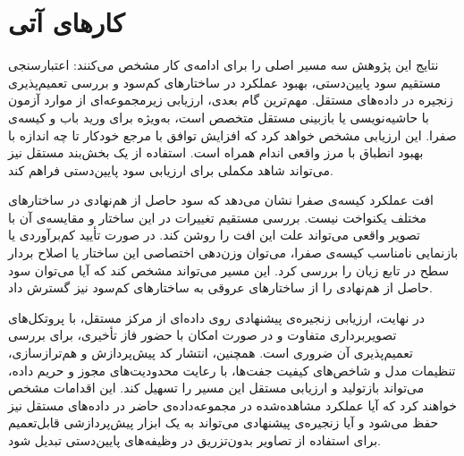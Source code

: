 \section{کارهای آتی}

\label{sec:c-future}

نتایج این پژوهش سه مسیر اصلی را برای ادامه‌ی کار مشخص می‌کنند: اعتبارسنجی مستقیم سود پایین‌دستی، بهبود عملکرد در ساختارهای کم‌سود و بررسی تعمیم‌پذیری زنجیره در داده‌های مستقل. مهم‌ترین گام بعدی، ارزیابی زیرمجموعه‌ای از موارد آزمون با حاشیه‌نویسی یا بازبینی مستقل متخصص است، به‌ویژه برای ورید باب و کیسه‌ی صفرا. این ارزیابی مشخص خواهد کرد که افزایش توافق با مرجع خودکار تا چه اندازه با بهبود انطباق با مرز واقعی اندام همراه است. استفاده از یک بخش‌بند مستقل نیز می‌تواند شاهد مکملی برای ارزیابی سود پایین‌دستی فراهم کند.

افت عملکرد کیسه‌ی صفرا نشان می‌دهد که سود حاصل از هم‌نهادی در ساختارهای مختلف یکنواخت نیست. بررسی مستقیم تغییرات  در این ساختار و مقایسه‌ی آن با تصویر واقعی می‌تواند علت این افت را روشن کند. در صورت تأیید کم‌برآوردی یا بازنمایی نامناسب کیسه‌ی صفرا، می‌توان وزن‌دهی اختصاصی این ساختار یا اصلاح بردار سطح در تابع زیان را بررسی کرد. این مسیر می‌تواند مشخص کند که آیا می‌توان سود حاصل از هم‌نهادی را از ساختارهای عروقی به ساختارهای کم‌سود نیز گسترش داد.

در نهایت، ارزیابی زنجیره‌ی پیشنهادی روی داده‌ای از مرکز مستقل، با پروتکل‌های تصویربرداری متفاوت و در صورت امکان با حضور فاز تأخیری، برای بررسی تعمیم‌پذیری آن ضروری است. همچنین، انتشار کد پیش‌پردازش و هم‌ترازسازی، تنظیمات مدل و شاخص‌های کیفیت جفت‌ها، با رعایت محدودیت‌های مجوز و حریم داده، می‌تواند بازتولید و ارزیابی مستقل این مسیر را تسهیل کند. این اقدامات مشخص خواهند کرد که آیا عملکرد مشاهده‌شده در مجموعه‌داده‌ی حاضر در داده‌های مستقل نیز حفظ می‌شود و آیا زنجیره‌ی پیشنهادی می‌تواند به یک ابزار پیش‌پردازشی قابل‌تعمیم برای استفاده از تصاویر بدون‌تزریق در وظیفه‌های پایین‌دستی تبدیل شود.
